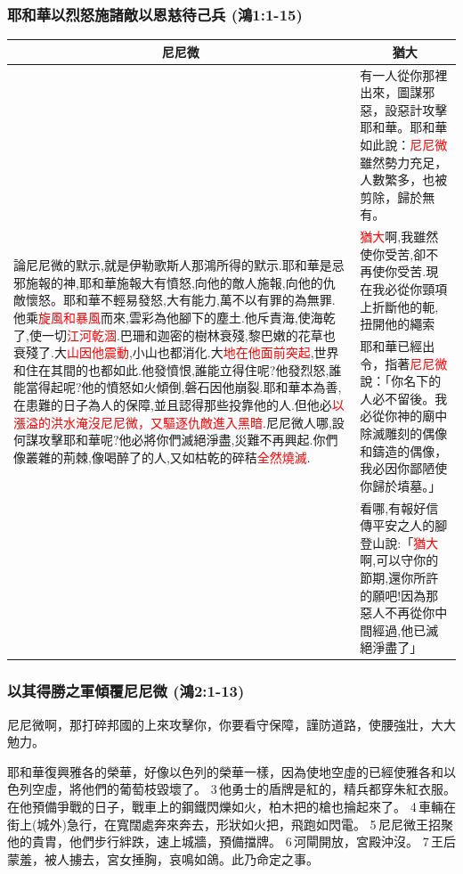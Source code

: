 \subsubsection{耶和華以烈怒施諸敵以恩慈待己兵 (鴻1:1-15)}
\begin{table}[H]
\centering
\begin{tabular}{p{10.25cm}|p{}}\hline\hline
\multicolumn{1}{c|}{尼尼微}&\multicolumn{1}{c}{猶大}\\\hline
\multirow{4}{10.5cm}{論尼尼微的默示,就是伊勒歌斯人那鴻所得的默示.耶和華是忌邪施報的神,耶和華施報大有憤怒,向他的敵人施報,向他的仇敵懷怒。耶和華不輕易發怒,大有能力,萬不以有罪的為無罪.他乘\textcolor{red}{旋風和暴風}而來,雲彩為他腳下的塵土.他斥責海,使海乾了,使一切\textcolor{red}{江河乾涸}.巴珊和迦密的樹林衰殘,黎巴嫩的花草也衰殘了.大\textcolor{red}{山因他震動},小山也都消化.大\textcolor{red}{地在他面前突起},世界和住在其間的也都如此.他發憤恨,誰能立得住呢?他發烈怒,誰能當得起呢?他的憤怒如火傾倒,磐石因他崩裂.耶和華本為善,在患難的日子為人的保障,並且認得那些投靠他的人.但他必\textcolor{red}{以漲溢的洪水淹沒尼尼微，又驅逐仇敵進入黑暗}.尼尼微人哪,設何謀攻擊耶和華呢?他必將你們滅絕淨盡,災難不再興起.你們像叢雜的荊棘,像喝醉了的人,又如枯乾的碎秸\textcolor{red}{全然燒滅}.}
&有一人從你那裡出來，圖謀邪惡，設惡計攻擊耶和華。耶和華如此說：\textcolor{red}{尼尼微}雖然勢力充足，人數繁多，也被剪除，歸於無有。\\\cline{2-2}
&\textcolor{red}{猶大}啊,我雖然使你受苦,卻不再使你受苦.現在我必從你頸項上折斷他的軛,扭開他的繩索\\\cline{2-2}
&耶和華已經出令，指著\textcolor{red}{尼尼微}說：「你名下的人必不留後。我必從你神的廟中除滅雕刻的偶像和鑄造的偶像，我必因你鄙陋使你歸於墳墓。」\\\cline{2-2}
&看哪,有報好信傳平安之人的腳登山說:「\textcolor{red}{猶大}啊,可以守你的節期,還你所許的願吧!因為那惡人不再從你中間經過,他已滅絕淨盡了」\\\hline
\end{tabular}
\end{table}


\subsubsection{以其得勝之軍傾覆尼尼微 (鴻2:1-13)}
尼尼微啊，那打碎邦國的上來攻擊你，你要看守保障，謹防道路，使腰強壯，大大勉力。 

耶和華復興雅各的榮華，好像以色列的榮華一樣，因為使地空虛的已經使雅各和以色列空虛，將他們的葡萄枝毀壞了。 3 他勇士的盾牌是紅的，精兵都穿朱紅衣服。在他預備爭戰的日子，戰車上的鋼鐵閃爍如火，柏木把的槍也掄起來了。 4 車輛在街上(城外)急行，在寬闊處奔來奔去，形狀如火把，飛跑如閃電。 5 尼尼微王招聚他的貴胄，他們步行絆跌，速上城牆，預備擋牌。 6 河閘開放，宮殿沖沒。 7 王后蒙羞，被人擄去，宮女捶胸，哀鳴如鴿。此乃命定之事。

